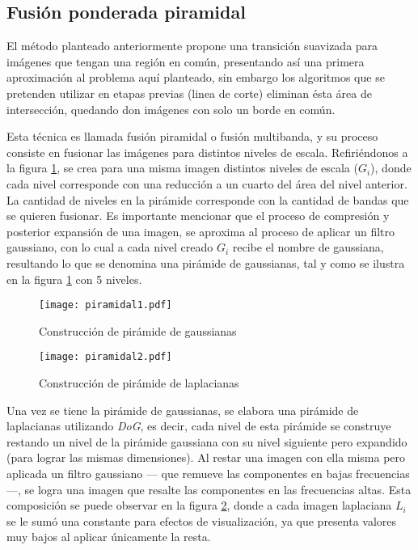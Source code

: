 \subsection{Fusión ponderada piramidal}

El método planteado anteriormente propone una transición suavizada para imágenes que tengan una región en común, presentando así una primera aproximación al problema aquí planteado, sin embargo los algoritmos que se pretenden utilizar en etapas previas (linea de corte) eliminan ésta área de intersección, quedando don imágenes con solo un borde en común. 

Esta técnica es llamada fusión piramidal o fusión multibanda, y su proceso consiste en fusionar las imágenes para distintos niveles de escala. Refiriéndonos a la figura \ref{imagen:piramidal1}, se crea para una misma imagen distintos niveles de escala ($G_i$), donde cada nivel corresponde con una reducción a un cuarto del área del nivel anterior. La cantidad de niveles en la pirámide corresponde con la cantidad de bandas que se quieren fusionar. Es importante mencionar que el proceso de compresión y posterior expansión de una imagen, se aproxima al proceso de aplicar un filtro gaussiano, con lo cual a cada nivel creado $G_i$ recibe el nombre de gaussiana, resultando lo que se denomina una pirámide de gaussianas, tal y como se ilustra en la figura \ref{imagen:piramidal1} con 5 niveles.

\begin{figure}[h]
	\centering
	\texttt{[image: piramidal1.pdf]}
	\caption[Construcción de pirámide de gaussianas]{Construcción de pirámide de gaussianas}
	\label{imagen:piramidal1}
\end{figure}

\begin{figure}[h]
	\centering
	\texttt{[image: piramidal2.pdf]}
	\caption[Construcción de pirámide de laplacianas]{Construcción de pirámide de laplacianas}
	\label{imagen:piramidal2}
\end{figure}

Una vez se tiene la pirámide de gaussianas, se elabora una pirámide de laplacianas utilizando \textit{DoG}, es decir, cada nivel de esta pirámide se construye restando un nivel de la pirámide gaussiana con su nivel siguiente pero expandido (para lograr las mismas dimensiones). Al restar una imagen con ella misma pero aplicada un filtro gaussiano --- que remueve las componentes en bajas frecuencias ---, se logra una imagen que resalte las componentes en las frecuencias altas. Esta composición se puede observar en la figura \ref{imagen:piramidal2}, donde a cada imagen laplaciana $L_i$ se le sumó una constante para efectos de visualización, ya que presenta valores muy bajos al aplicar únicamente la resta.

